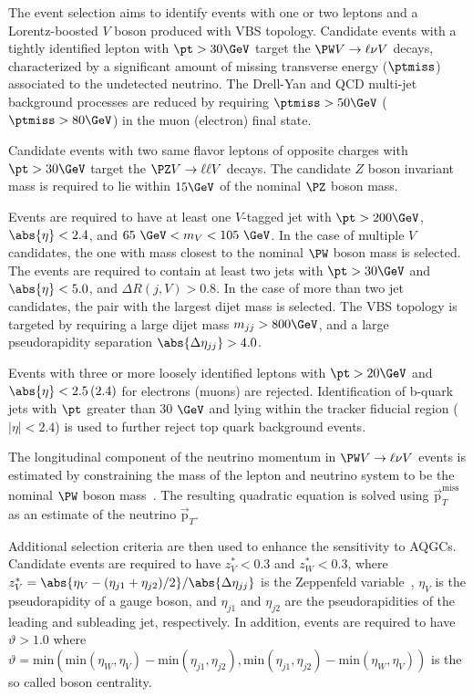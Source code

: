 The event selection aims to identify events with one or two leptons and a Lorentz-boosted $V$ boson produced with VBS topology. Candidate events with a tightly identified lepton with $\pt>30\GeV$ target the $\PW V \rightarrow \ell \nu V$ decays, characterized by a significant amount of missing transverse energy ($\ptmiss$) associated to the undetected neutrino. The Drell-Yan and QCD multi-jet background processes are reduced by requiring $\ptmiss>50\GeV$ ($\ptmiss>80\GeV$) in the muon (electron) final state. 

Candidate events with two same flavor leptons of opposite charges with  $\pt>30\GeV$ target the  $\PZ V \rightarrow \ell \ell V$ decays. The candidate $Z$ boson invariant mass is required to lie within $15\GeV$ of the nominal $\PZ$ boson mass.

Events are required to have at least one $V$-tagged jet with $\pt>200\GeV$, $\abs{\eta}<2.4$, and $65~\GeV < m_{V} < 105~\GeV$. In the case of multiple $V$ candidates, the one with mass closest to the nominal $\PW$ boson mass is selected.  The events are required to contain at least two jets with $\pt>30\GeV$ and $\abs{\eta}<5.0$, and $\Delta R(j,V)>0.8$. In the case of more than two jet candidates, the pair with the largest dijet mass is selected. The VBS topology is targeted by requiring a large dijet mass $m_{jj}>800\GeV$, and a large pseudorapidity separation $\abs{\Delta \eta_{jj}}>4.0$.  

Events with three or more loosely identified leptons with $\pt>20\GeV$ and $\abs{\eta}<2.5\,(2.4)$ for electrons (muons) are rejected. Identification of b-quark jets with $\pt$ greater than 30 $\GeV$ and lying within the tracker fiducial region ($\left|\eta\right|<2.4$)  is used to further reject top quark background events.   

The longitudinal component of the neutrino momentum in $\PW V \rightarrow \ell \nu V$ events is estimated by constraining the mass of the lepton and neutrino system to be the nominal $\PW$ boson mass~\cite{Sirunyan:2018iff}. The resulting quadratic equation is solved using $\vec{\mathrm{p}}_{T}^{\mathrm{miss}}$ as an estimate of the neutrino $\vec{\mathrm{p}}_{T}$.

Additional selection criteria are then used to enhance the sensitivity to AQGCs. Candidate events are required to have  $z_{V}^{*} < 0.3$ and $z_{W}^{*} < 0.3$, where $z_{V}^{*} = \abs{\eta_{V}-(\eta_{j1}+\eta_{j2})/2}/\abs{\Delta \eta_{jj}}$ is the Zeppenfeld variable~\cite{Rainwater:1996ud}, $\eta_{V}$ is the
pseudorapidity of a gauge boson, and $\eta_{j1}$ and $\eta_{j2}$ are the pseudorapidities of the leading and subleading jet, respectively. In addition, events are required to have $\vartheta>1.0$ where $\vartheta = \mathrm{min}(\mathrm{min}(\eta_{W},\eta_{V})-\mathrm{min}(\eta_{j1},\eta_{j2}),\mathrm{min}(\eta_{j1},\eta_{j2})-\mathrm{min}(\eta_{W},\eta_{V}))$ is the so called boson centrality. 

